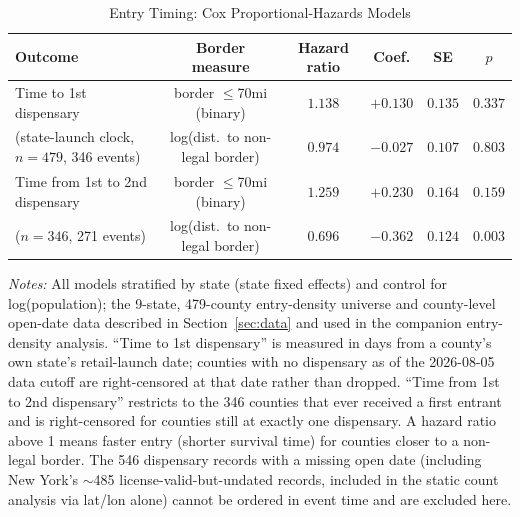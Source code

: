 \begin{table}[htbp]
\centering
\caption{Entry Timing: Cox Proportional-Hazards Models}
\label{tab:entry_hazard}
\begin{tabular}{lccccc}
\toprule
Outcome & Border measure & Hazard ratio & Coef. & SE & $p$ \\
\midrule
Time to 1st dispensary & border $\le$70mi (binary) & $1.138$ & $+0.130$ & $0.135$ & $0.337$ \\
(state-launch clock, $n=479$, 346 events) & log(dist.\ to non-legal border) & $0.974$ & $-0.027$ & $0.107$ & $0.803$ \\
\midrule
Time from 1st to 2nd dispensary & border $\le$70mi (binary) & $1.259$ & $+0.230$ & $0.164$ & $0.159$ \\
($n=346$, 271 events) & log(dist.\ to non-legal border) & $0.696$ & $-0.362$ & $0.124$ & $0.003$ \\
\bottomrule
\end{tabular}
\begin{minipage}{0.95\textwidth}
\vspace{0.3em}
\footnotesize
\textit{Notes:} All models stratified by state (state fixed effects) and control for log(population); the
9-state, 479-county entry-density universe and county-level open-date data described in
Section~\ref{sec:data} and used in the companion entry-density analysis. ``Time to 1st dispensary'' is
measured in days from a county's own state's retail-launch date; counties with no dispensary as of the
2026-08-05 data cutoff are right-censored at that date rather than dropped. ``Time from 1st to 2nd
dispensary'' restricts to the 346 counties that ever received a first entrant and is right-censored for
counties still at exactly one dispensary. A hazard ratio above 1 means faster entry (shorter survival time)
for counties closer to a non-legal border. The 546 dispensary records with a missing open date (including
New York's $\sim$485 license-valid-but-undated records, included in the static count analysis via lat/lon
alone) cannot be ordered in event time and are excluded here.
\end{minipage}
\end{table}
